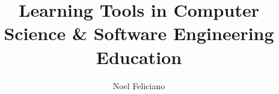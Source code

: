 \documentclass{report}
\begin{document}
\title{Learning Tools in Computer Science & Software Engineering Education}

  \author{
    Noel Feliciano
}

\maketitle

\tableofcontents


\end{document}
